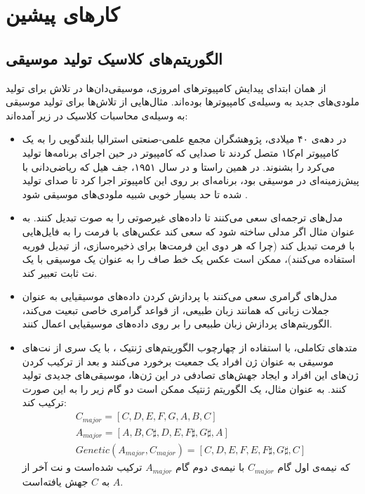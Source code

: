 \chapter{کارهای پیشین}

\section{الگوریتم‌های کلاسیک تولید موسیقی}

از همان ابتدای پیدایش کامپیوترهای امروزی، موسیقی‌دان‌ها در تلاش برای تولید ملودی‌های جدید به وسیله‌ی کامپیوترها بوده‌اند.
مثال‌هایی از تلاش‌ها برای تولید موسیقی به وسیله‌ی محاسبات کلاسیک در زیر آمده‌اند:

\begin{itemize}
    \item 
    در دهه‌ی ۴۰ میلادی، پژوهشگران مجمع علمی-صنعتی استرالیا
بلندگویی را به یک کامپیوتر ام‌کا۱
متصل کردند تا صدایی که کامپیوتر در حین اجرای برنامه‌ها تولید می‌کرد را بشنوند. در همین راستا و در سال ۱۹۵۱، جف هیل
که ریاضی‌دانی با پیش‌زمینه‌ای در موسیقی بود، برنامه‌ای بر روی این کامپیوتر اجرا کرد تا صدای تولید شده تا حد بسیار خوبی شبیه ملودی‌های موسیقی شود
\cite{CSIR_music}.

\item
مدل‌های ترجمه‌ای
سعی می‌کنند تا داده‌های غیرصوتی را به صوت تبدیل کنند. به عنوان مثال اگر مدلی ساخته شود که سعی کند عکس‌های با فرمت 
را به فایل‌هایی با فرمت
تبدیل کند (چرا که هر دوی این فرمت‌ها برای ذخیره‌سازی، از تبدیل فوریه استفاده می‌کنند)، ممکن است عکس یک خط صاف را به عنوان یک موسیقی با یک نت ثابت تعبیر کند.

\item
مدل‌های گرامری
سعی می‌کنند با پردازش کردن داده‌های موسیقیایی به عنوان جملات زبانی که همانند زبان طبیعی، از قواعد گرامری خاصی تبعیت می‌کند، الگوریتم‌های پردازش زبان طبیعی
را بر روی داده‌های موسیقیایی اعمال کنند.

\item
متدهای تکاملی، با استفاده از چهارچوب الگوریتم‌های ژنتیک
، با یک سری از نت‌های موسیقی به عنوان ژن افراد یک جمعیت برخورد می‌کنند و بعد از ترکیب کردن ژن‌های این افراد و ایجاد جهش‌های تصادفی در این ژن‌ها، موسیقی‌های جدیدی تولید کنند.
به عنوان مثال، یک الگوریتم ژنتیک ممکن است دو گام زیر را به این صورت ترکیب کند:
\begin{equation}
\begin{gathered}
    C_{major} = [C, D, E, F, G, A, B, C]\\[3pt]
    A_{major} = [A, B, C\sharp, D, E, F\sharp, G\sharp, A] \\
    Genetic(A_{major}, C_{major}) = [C, D, E, F, E, F\sharp, G\sharp, C] 
\end{gathered}
\end{equation}
که نیمه‌ی اول گام 
$C_{major}$
با نیمه‌ی دوم گام
$A_{major}$
ترکیب شده‌است و نت آخر از 
$A$
به
$C$
جهش یافته‌است.


\end{itemize}
